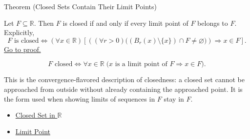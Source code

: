 \begin{theorembox}{Theorem (Closed Sets Contain Their Limit Points)}
\begin{theorem}
\label{thm:closed-iff-contains-limit-points}
Let $F\subseteq\mathbb{R}$.  Then $F$ is closed if and only if every limit
point of $F$ belongs to $F$.  Explicitly,
\[
  F\text{ is closed}
  \Longleftrightarrow
  (\forall x\in\mathbb{R})
  \left[
  \left((\forall r>0)\bigl((B_r(x)\setminus\{x\})\cap F\neq\varnothing\bigr)\right)
  \Longrightarrow
  x\in F
  \right].
\]
\hyperref[prf:closed-iff-contains-limit-points]{Go to proof.}
\end{theorem}
\end{theorembox}
\begin{remark*}
\[
F \text{ closed} \Longleftrightarrow \forall x\in\mathbb{R}\;\bigl(x \text{ is a limit point of } F \Longrightarrow x\in F\bigr).
\]
\end{remark*}
\begin{remark*}[Interpretation]
This is the convergence-flavored description of closedness: a closed set cannot be approached from outside without already containing the approached point. It is the form used when showing limits of sequences in $F$ stay in $F$.
\end{remark*}
\begin{dependencies}
\begin{itemize}
  \item \hyperref[def:closed-set]{Closed Set in $\mathbb{R}$}
  \item \hyperref[def:limit-point]{Limit Point}
\end{itemize}
\end{dependencies}

